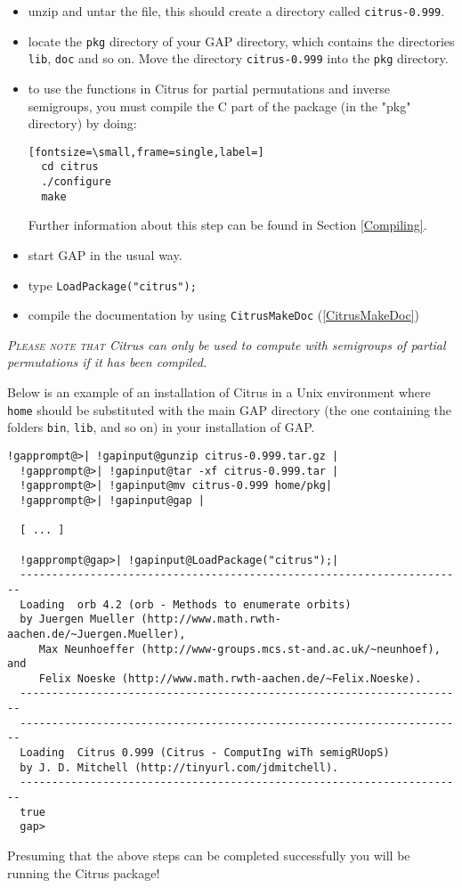 \documentclass[a4paper,11pt]{report}
\begin{document}
{{\begin{itemize}
\noindent\vspace{\baselineskip} \href{http://www-history.mcs.st-and.ac.uk/~jamesm/citrus/index.html } {\texttt{http://www-history.mcs.st-and.ac.uk/\texttt{}jamesm/citrus/index.html }} 
\item  unzip and untar the file, this should create a directory called \texttt{citrus-0.999}.
\item  locate the \texttt{pkg} directory of your \textsf{GAP} directory, which contains the directories \texttt{lib}, \texttt{doc} and so on. Move the directory \texttt{citrus-0.999} into the \texttt{pkg} directory. 
\item  to use the functions in \textsf{Citrus} for partial permutations and inverse semigroups, you must compile the C part
of the package (in the "pkg" directory) by doing: 
\begin{Verbatim}[fontsize=\small,frame=single,label=]
  cd citrus
  ./configure
  make
\end{Verbatim}
 Further information about this step can be found in Section \ref{Compiling}. 
\item  start \textsf{GAP} in the usual way.
\item  type \texttt{LoadPackage("citrus");}
\item  compile the documentation by using \texttt{CitrusMakeDoc} (\ref{CitrusMakeDoc}) 
\end{itemize}
 \emph{\textsc{Please note that} \textsf{Citrus} can only be used to compute with semigroups of partial permutations if it has
been compiled. }

 Below is an example of an installation of \textsf{Citrus} in a Unix environment where \texttt{home} should be substituted with the main \textsf{GAP} directory (the one containing the folders \texttt{bin}, \texttt{lib}, and so on) in your installation of \textsf{GAP}.

 
\begin{Verbatim}[commandchars=!@|,fontsize=\small,frame=single,label=Example]
  !gapprompt@>| !gapinput@gunzip citrus-0.999.tar.gz |
  !gapprompt@>| !gapinput@tar -xf citrus-0.999.tar |
  !gapprompt@>| !gapinput@mv citrus-0.999 home/pkg|
  !gapprompt@>| !gapinput@gap |
  
  [ ... ]
  
  !gapprompt@gap>| !gapinput@LoadPackage("citrus");|
  ----------------------------------------------------------------------
  Loading  orb 4.2 (orb - Methods to enumerate orbits)
  by Juergen Mueller (http://www.math.rwth-aachen.de/~Juergen.Mueller),
     Max Neunhoeffer (http://www-groups.mcs.st-and.ac.uk/~neunhoef), and
     Felix Noeske (http://www.math.rwth-aachen.de/~Felix.Noeske).
  ----------------------------------------------------------------------
  ----------------------------------------------------------------------
  Loading  Citrus 0.999 (Citrus - ComputIng wiTh semigRUopS)
  by J. D. Mitchell (http://tinyurl.com/jdmitchell).
  ----------------------------------------------------------------------
  true
  gap>
\end{Verbatim}
 Presuming that the above steps can be completed successfully you will be
running the \textsf{Citrus} package!

}}
\end{document}
